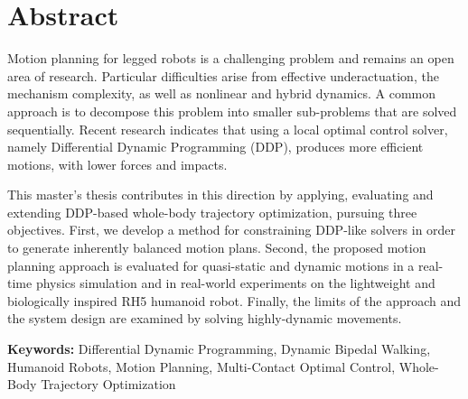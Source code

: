 \thispagestyle{empty}
\chapter*{Abstract}

Motion planning for legged robots is a challenging problem and remains an open area of research. Particular difficulties arise from effective underactuation, the mechanism complexity, as well as nonlinear and hybrid dynamics.
A common approach is to decompose this problem into smaller sub-problems that are solved sequentially. Recent research indicates that using a local optimal control solver, namely Differential Dynamic Programming (DDP), produces more efficient motions, with lower forces and impacts.

This master's thesis contributes in this direction by applying, evaluating and extending DDP-based whole-body trajectory optimization, pursuing three objectives. 
First, we develop a method for constraining DDP-like solvers in order to generate inherently balanced motion plans. 
Second, the proposed motion planning approach is evaluated for quasi-static and dynamic motions in a real-time physics simulation and in real-world experiments on the lightweight and biologically inspired RH5 humanoid robot.
Finally, the limits of the approach and the system design are examined by solving highly-dynamic movements. 

\vfill
\noindent\textbf{Keywords:} Differential Dynamic Programming, Dynamic Bipedal Walking, Humanoid Robots, Motion Planning, Multi-Contact Optimal Control, Whole-Body Trajectory Optimization
 











